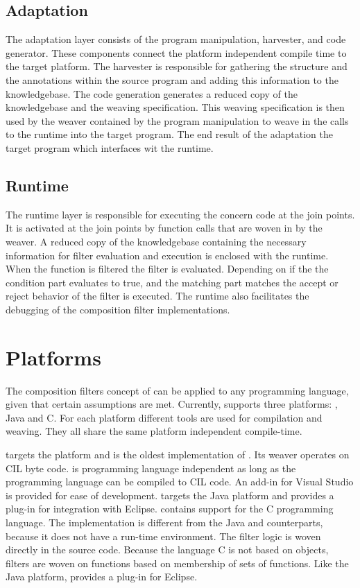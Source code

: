\subsection{Adaptation}
The adaptation layer consists of the program manipulation, harvester, and code generator.
These components connect the platform independent compile time to the target platform.
The harvester is responsible for gathering the structure and the annotations within the source program and adding this information to the knowledgebase.
The code generation generates a reduced copy of the knowledgebase and the weaving specification.
This weaving specification is then used by the weaver contained by the program manipulation to weave in the calls to the runtime into the target program.
The end result of the adaptation the target program which interfaces wit the runtime.

\subsection{Runtime}
The runtime layer is responsible for executing the concern code at the join points.
It is activated at the join points by function calls that are woven in by the weaver.
A reduced copy of the knowledgebase containing the necessary information for filter evaluation and execution is enclosed with the runtime.
When the function is filtered the filter is evaluated.
Depending on if the the condition part evaluates to true, and the matching part matches the accept or reject behavior of the filter is executed.
The runtime also facilitates the debugging of the composition filter implementations.

\section{Platforms}
The composition filters concept of \Compose* can be applied to any programming language, given that certain assumptions are met.
Currently, \Compose* supports three platforms: \dotNET, Java and C\@.
For each platform different tools are used for compilation and weaving.
They all share the same platform independent compile-time.

\Compose*[.NET] targets the \dotNET platform and is the oldest implementation of \Compose*.
Its weaver operates on CIL byte code.
\Compose*[.NET] is programming language independent as long as the programming language can be compiled to CIL code.
An add-in for Visual Studio is provided for ease of development.
\Compose*[J] targets the Java platform and provides a plug-in for integration with Eclipse.
\Compose*[C] contains support for the C programming language.
The implementation is different from the Java and \dotNET counterparts, because it does not have a run-time environment.
The filter logic is woven directly in the source code.
Because the language C is not based on objects, filters are woven on functions based on membership of sets of functions.
Like the Java platform, \Compose*[C] provides a plug-in for Eclipse.